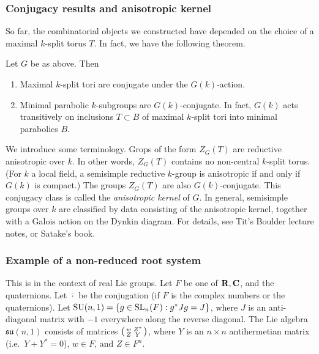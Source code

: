 \subsubsection{Conjugacy results and anisotropic kernel}

So far, the combinatorial objects we constructed have depended on the choice of 
a maximal $k$-split torus $T$. In fact, we have the following theorem. 

\begin{theo}
Let $G$ be as above. Then 
\begin{enumerate}
  \item Maximal $k$-split tori are conjugate under the $G(k)$-action. 
  \item Minimal parabolic $k$-subgroups are $G(k)$-conjugate. In fact, 
    $G(k)$ acts transitively on inclusions $T\subset B$ of maximal $k$-split 
    tori into minimal parabolics $B$. 
\end{enumerate}
\end{theo}

We introduce some terminology. Grops of the form $Z_G(T)$ are reductive anisotropic 
over $k$. In other words, $Z_G(T)$ contains no non-central $k$-split torus. (For 
$k$ a local field, a semisimple 
reductive $k$-group is anisotropic if and only if $G(k)$ is compact.) The groups 
$Z_G(T)$ are also $G(k)$-conjugate. This conjugacy class is called the 
\emph{anisotropic kernel} of $G$. In general, semisimple groups over $k$ are 
classified by data consisting of the anisotropic kernel, together with a 
Galois action on the Dynkin diagram. For details, see Tit's Boulder lecture 
notes, or Satake's book. 


\subsubsection{Example of a non-reduced root system}

This is in the context of real Lie groups. Let $F$ be one of $\mathbf{R},\mathbf{C}$, and 
the quaternions. Let $\overline{\cdot}$ be the conjugation (if $F$ is the 
complex numbers or the quaternions). Let 
$\operatorname{SU}(n,1) = \{g\in \operatorname{SL}_n(F):g^\ast J g=J\}$, where 
$J$ is an anti-diagonal matrix with $-1$ everywhere along the reverse 
diagonal. The Lie algebra $\mathfrak{su}(n,1)$ consists of matrices 
$\bigl(\begin{smallmatrix} w & Z^\ast \\ Z & Y \end{smallmatrix} \bigr)$, where $Y$ is an $n\times n$ antihermetian matrix 
(i.e.\ $Y+Y^\ast=0$), $w\in F$, and $Z\in F^n$. 

